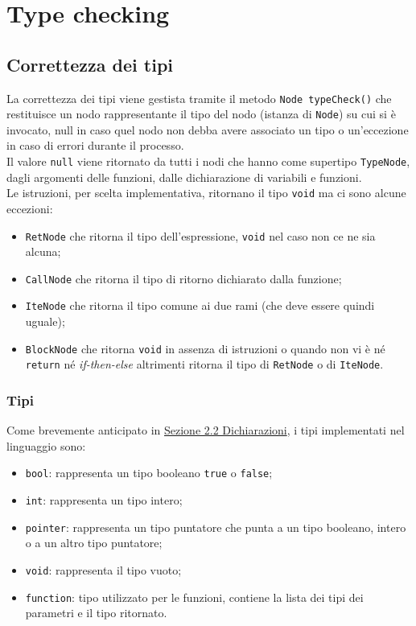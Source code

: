 \documentclass[../report.tex]{subfiles}
\begin{document}
\chapter{Type checking}\label{c:typechecking}
\section{Correttezza dei tipi}\label{s:correttezza-tipi}
La correttezza dei tipi viene gestista tramite il metodo \verb|Node typeCheck()| che restituisce un nodo rappresentante il tipo del nodo (istanza di \verb|Node|) su cui si è invocato, null in caso quel nodo non debba avere associato un tipo o  un'eccezione in caso di errori durante il processo.\\
Il valore \verb|null| viene ritornato da tutti i nodi che hanno come supertipo \verb|TypeNode|, dagli argomenti delle funzioni, dalle dichiarazione di variabili e funzioni.\\
Le istruzioni, per scelta implementativa, ritornano il tipo \verb|void| ma ci sono alcune eccezioni:
\begin{itemize}
    \item \verb|RetNode| che ritorna il tipo dell'espressione, \verb|void| nel caso non ce ne sia alcuna;
    \item \verb|CallNode| che ritorna il tipo di ritorno dichiarato dalla funzione;
    \item \verb|IteNode| che ritorna il tipo comune ai due rami (che deve essere quindi uguale);
    \item \verb|BlockNode| che ritorna \verb|void| in assenza di istruzioni o quando non vi è n\'e \verb|return| n\'e \textit{if-then-else} altrimenti ritorna il tipo di \verb|RetNode| o di \verb|IteNode|. 
\end{itemize}
\subsection{Tipi}\label{s:tipi}
Come brevemente anticipato in \hyperref[s:dichiarazioni]{Sezione 2.2 Dichiarazioni}, i tipi implementati nel linguaggio sono:
\begin{itemize}
    \item \verb|bool|: rappresenta un tipo booleano \verb|true| o \verb|false|;
    \item \verb|int|: rappresenta un tipo intero;
    \item \verb|pointer|: rappresenta un tipo puntatore che punta a un tipo booleano, intero o a un altro tipo puntatore;
    \item \verb|void|: rappresenta il tipo vuoto;
    \item \verb|function|: tipo utilizzato per le funzioni, contiene la lista dei tipi dei parametri e il tipo ritornato.
\end{itemize}
\end{document}
